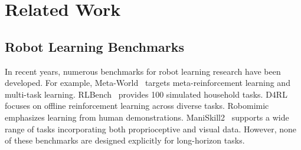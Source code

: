 \section{Related Work}

\subsection{Robot Learning Benchmarks}




In recent years, numerous benchmarks for robot learning research have been developed. For example, Meta-World~\cite{yu2020meta} targets meta-reinforcement learning and multi-task learning. RLBench~\cite{james2020rlbench} provides 100 simulated household tasks. D4RL~\cite{fu2020d4rl} focuses on offline reinforcement learning across diverse tasks. Robomimic~\cite{robomimic2021} emphasizes learning from human demonstrations. ManiSkill2~\cite{mu2021maniskill} supports a wide range of tasks incorporating both proprioceptive and visual data. However, none of these benchmarks are designed explicitly for long-horizon tasks.

